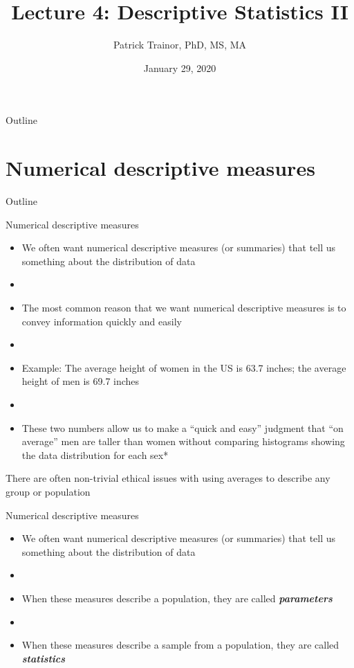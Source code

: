 \documentclass[xcolor=dvipsnames]{beamer}
\title[Lecture 4]{Lecture 4: Descriptive Statistics II}
\author[Patrick Trainor]{Patrick Trainor, PhD, MS, MA}
\institute[NMSU]{New Mexico State University}
\date{January 29, 2020}
\begin{document}
	
\begin{frame}
	\maketitle
\end{frame}

\begin{frame}{Outline}
	\tableofcontents[hideallsubsections]
\end{frame}

\section{Numerical descriptive measures}
\begin{frame}{Outline}
	\tableofcontents[currentsection,subsectionstyle=show/shaded/hide]
\end{frame}

\begin{frame}{Numerical descriptive measures}
	\begin{itemize}
		\item We often want numerical descriptive measures (or summaries) that tell us something about the distribution of data \pause
		\item[]
		\item The most common reason that we want numerical descriptive measures is to convey information quickly and easily \pause
		\item[]
		\item Example: The average height of women in the US is 63.7 inches; the average height of men is 69.7 inches \pause
		\item[]
		\item These two numbers allow us to make a ``quick and easy'' judgment that ``on average'' men are taller than women without comparing histograms showing the data distribution for each sex*
	\end{itemize}
{\tiny *There are often non-trivial ethical issues with using averages to describe any group or population}
\end{frame}

\begin{frame}{Numerical descriptive measures}
	\begin{itemize}
		\item We often want numerical descriptive measures (or summaries) that tell us something about the distribution of data
		\item[]
		\item When these measures describe a population, they are called \textbf{\emph{parameters}} \pause
		\item[]
		\item When these measures describe a sample from a population, they are called \textbf{\emph{statistics}}
	\end{itemize}
\end{frame}
\end{document}
